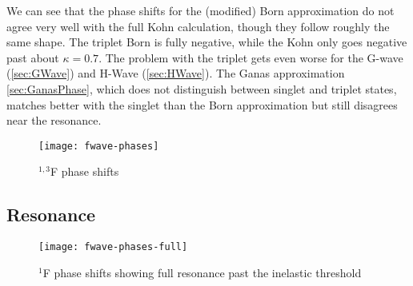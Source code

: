 \documentclass[Dissertation.tex]{subfiles}
\begin{document}
We can see that the phase shifts for the (modified) Born approximation do not 
agree very well with the full Kohn calculation, though they follow roughly 
the same shape. The triplet Born is fully negative, while the Kohn only goes 
negative past about $\kappa = 0.7$. The problem with the triplet gets even 
worse for the G-wave (\cref{sec:GWave}) and H-Wave (\cref{sec:HWave}).
The Ganas approximation \cref{sec:GanasPhase}, which does not distinguish
between singlet and triplet states, matches better with the singlet than the
Born approximation but still disagrees near the resonance.

%

\begin{figure}
	\centering
	\texttt{[image: fwave-phases]}
	\caption{$^{1,3}$F phase shifts}
	\label{fig:FWavePhase}
\end{figure}


\subsection{Resonance}
\label{sec:FWaveResonance}

\begin{figure}
	\centering
	\texttt{[image: fwave-phases-full]}
	\caption[Full $^1$F phase shifts]{$^1$F phase shifts showing full resonance past the inelastic threshold}
	\label{fig:FWavePhaseFull}
\end{figure}
\end{document}
